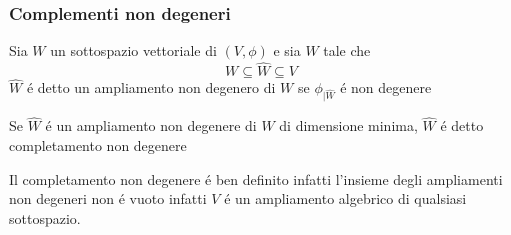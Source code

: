\subsubsection{Complementi non degeneri}
\begin{defn}\bianco
Sia $W$ un sottospazio vettoriale di $(V,\phi) $ e sia $\hat{W}$ tale che 
$$ W \subseteq \hat{W} \subseteq V $$ 
$\hat{W}$ \'e detto un ampliamento non degenero di $W$ se $\phi_{\vert \hat{W}} $ \'e non degenere
\end{defn}

\begin{defn}
Se $\hat{W}$ \'e un ampliamento non degenere di $W$ di dimensione minima, $ \hat{W}$ \'e detto completamento non degenere
\end{defn}
\begin{oss}Il completamento non degenere \'e ben definito infatti l'insieme degli ampliamenti non degeneri non \'e vuoto infatti $V$ \'e un ampliamento algebrico di qualsiasi sottospazio.
\end{oss}
\spazio
